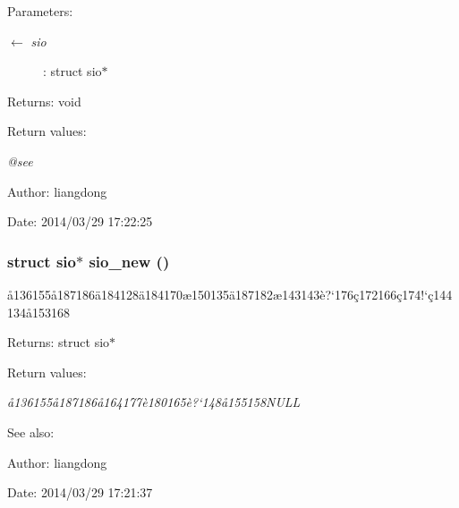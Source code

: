 \begin{Desc}
\item[Parameters:]
\begin{description}
\item[\mbox{$\leftarrow$} {\em sio}]: struct sio$\ast$ \end{description}
\end{Desc}
\begin{Desc}
\item[Returns:]void \end{Desc}
\begin{Desc}
\item[Return values:]
\begin{description}
\item[{\em @see}]\end{description}
\end{Desc}
\begin{Desc}
\item[Author:]liangdong \end{Desc}
\begin{Desc}
\item[Date:]2014/03/29 17:22:25 \end{Desc}
\subsubsection{\setlength{\rightskip}{0pt plus 5cm}struct sio$\ast$ sio\_\-new ()}\label{sio_8c_a1}


\aa{}136155\aa{}187186\"{a}184128\"{a}184170\ae{}150135\"{a}187182\ae{}143143\`{e}?`176\c{c}172166\c{c}174!`\c{c}144134\aa{}153168 

\begin{Desc}
\item[Returns:]struct sio$\ast$ \end{Desc}
\begin{Desc}
\item[Return values:]
\begin{description}
\item[{\em \aa{}136155\aa{}187186\aa{}164177\`{e}180165\`{e}?`148\aa{}155158NULL}]\end{description}
\end{Desc}
\begin{Desc}
\item[See also:]\end{Desc}
\begin{Desc}
\item[Author:]liangdong \end{Desc}
\begin{Desc}
\item[Date:]2014/03/29 17:21:37 \end{Desc}
